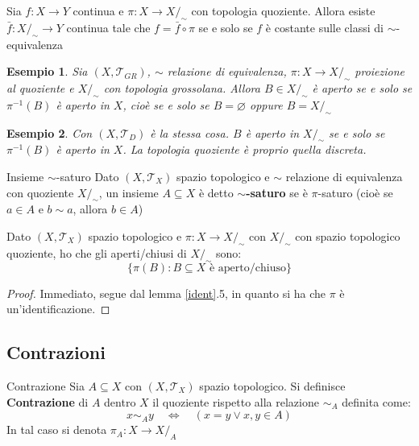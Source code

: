\documentclass[11pt,a4paper,twoside]{article}
\newtheorem{es}{Esempio}
\theoremstyle{definition}
\begin{document}
\begin{prop}{}{}
	Sia $f:X \to Y$ continua e $\pi: X \to X/_\sim$ con topologia quoziente. Allora esiste $\bar f:X/_\sim \to Y$ continua tale che $f = \bar f \circ \pi$ se e solo se $f$ è costante sulle classi di $\sim$-equivalenza
\end{prop}

\begin{es}
	Sia $(X, \mathcal T_{GR})$, $\sim$ relazione di equivalenza, $\pi:X \to X/_\sim$ proiezione al quoziente e $X/_\sim$ con topologia grossolana. Allora $B \in X/_\sim$ è aperto se e solo se $\pi^{-1}(B)$ è aperto in $X$, cioè se e solo se $B = \varnothing$ oppure $B = X/_\sim$
\end{es}

\begin{es}
	Con $(X, \mathcal T_D)$ è la stessa cosa. $B$ è aperto in $X/_\sim$ se e solo se $\pi^{-1}(B)$ è aperto in $X$. La topologia quoziente è proprio quella discreta.
\end{es}

\begin{defn}{Insieme $\sim$-saturo}{}
	Dato $(X, \mathcal T_X)$ spazio topologico e $\sim$ relazione di equivalenza con quoziente $X/_\sim$, un insieme $A \subseteq X$ è detto $\mathbf \sim$\textbf{-saturo} se è $\pi$-saturo (cioè se $a \in A$ e $b \sim a$, allora $b \in A$)
\end{defn}

\begin{prop}{}{}
	Dato $(X, \mathcal T_X)$ spazio topologico e $\pi:X \to X/_\sim$ con $X/_\sim$ con spazio topologico quoziente, ho che gli aperti/chiusi di $X/_\sim$ sono:
	\[ \{ \pi(B): B \subseteq X\text{ è aperto/chiuso} \} \]
\end{prop}

\begin{proof}
	Immediato, segue dal lemma \ref{ident}.5, in quanto si ha che $\pi$ è un'identificazione.
\end{proof}

\subsection{Contrazioni}

\begin{defn}{Contrazione}{}
	Sia $A\subseteq X$ con $(X, \mathcal T_X)$ spazio topologico. Si definisce \textbf{Contrazione} di $A$ dentro $X$ il quoziente rispetto alla relazione $\sim_A$ definita come:
	\[ x \sim_A y \quad \Leftrightarrow \quad (x = y \vee x,y \in A)\]
	In tal caso si denota $\pi_A:X \to X/_A$
\end{defn}
\end{document}
